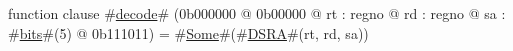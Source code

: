 function clause #\hyperref[zdecode]{decode}# (0b000000 @ 0b00000 @ rt : regno @ rd : regno @ sa : #\hyperref[zbits]{bits}#(5) @ 0b111011) =
  #\hyperref[zSome]{Some}#(#\hyperref[zDSRA]{DSRA}#(rt, rd, sa))
